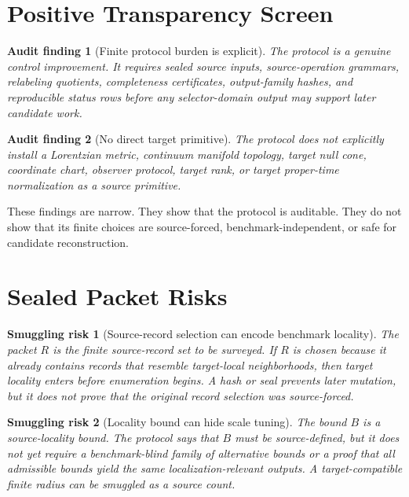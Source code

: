 \documentclass[11pt]{article}
\newtheorem{auditfinding}{Audit finding}
\newtheorem{smugglingrisk}{Smuggling risk}
\begin{document}
\section{Positive Transparency Screen}

\begin{auditfinding}[Finite protocol burden is explicit]
The protocol is a genuine control improvement. It requires sealed source
inputs, source-operation grammars, relabeling quotients, completeness
certificates, output-family hashes, and reproducible status rows before any
selector-domain output may support later candidate work.
\end{auditfinding}

\begin{auditfinding}[No direct target primitive]
The protocol does not explicitly install a Lorentzian metric, continuum
manifold topology, target null cone, coordinate chart, observer protocol,
target rank, or target proper-time normalization as a source primitive.
\end{auditfinding}

These findings are narrow. They show that the protocol is auditable. They do
not show that its finite choices are source-forced, benchmark-independent, or
safe for candidate reconstruction.

\section{Sealed Packet Risks}

\begin{smugglingrisk}[Source-record selection can encode benchmark locality]
The packet \(R\) is the finite source-record set to be surveyed. If \(R\) is
chosen because it already contains records that resemble target-local
neighborhoods, then target locality enters before enumeration begins. A hash
or seal prevents later mutation, but it does not prove that the original
record selection was source-forced.
\end{smugglingrisk}

\begin{smugglingrisk}[Locality bound can hide scale tuning]
The bound \(B\) is a source-locality bound. The protocol says that \(B\) must
be source-defined, but it does not yet require a benchmark-blind family of
alternative bounds or a proof that all admissible bounds yield the same
localization-relevant outputs. A target-compatible finite radius can be
smuggled as a source count.
\end{smugglingrisk}
\end{document}
